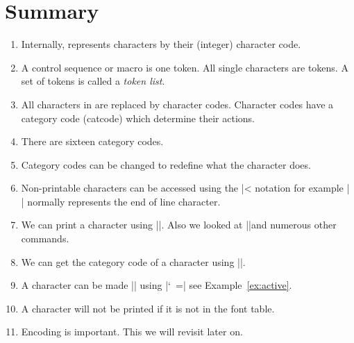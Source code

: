 \section{Summary}
 
\begin{enumerate}
\item Internally, \tex represents characters by their (integer) character code.
\item A control sequence or macro is one token. All single characters are tokens. A set of tokens is called a \emph{token list}.
\item All characters in \tex are replaced by character codes. Character codes have a category code (catcode) which determine their actions.
\item There are sixteen category codes.
\item Category codes can be changed to redefine what the character does.
\item Non-printable characters can be accessed using the |^^| notation for example |^^M| normally represents the end of line character. 
\item We can print a character using |\char|. Also we looked at |\chardef|and numerous other commands.
\item We can get the category code of a character using |\the\catcode|.
\item A character can be made |\active| using |\catcode `~=\active| see Example~\ref{ex:active}. 
\item A character will not be printed if it is not in the font table.
\item Encoding is important. This we will revisit later on.
\end{enumerate}

